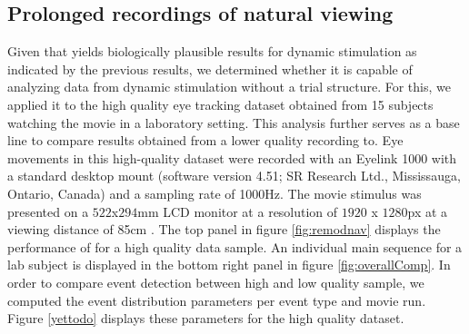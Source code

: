 
\subsection*{Prolonged recordings of natural viewing}\label{ana_2}




Given that \remodnav yields biologically plausible results for dynamic
stimulation as indicated by the previous results, we determined whether it is
capable of analyzing data from dynamic stimulation without a trial structure.
For this, we applied it to the high quality eye tracking dataset obtained from
15 subjects watching the movie in a laboratory setting. This analysis further
serves as a base line to compare results obtained from a lower quality
recording to. Eye movements in this high-quality dataset were recorded with an
Eyelink 1000 with a standard desktop mount (software version 4.51; SR Research
Ltd., Mississauga, Ontario, Canada) and a sampling rate of 1000Hz. The movie
stimulus was presented on a $522$x$294$mm LCD monitor at a resolution of $1920$
x $1280$px at a viewing distance of 85cm \citep{Hanke2016}.  The top panel in
figure \ref{fig:remodnav} displays the performance of \remodnav for a high
quality data sample. An individual main sequence for a lab subject is
displayed in the bottom right panel in figure \ref{fig:overallComp}. In order
to compare event detection between high and low quality sample, we computed
the event distribution parameters per event type and movie run. Figure
\ref{yettodo} displays these parameters for the high quality dataset.

